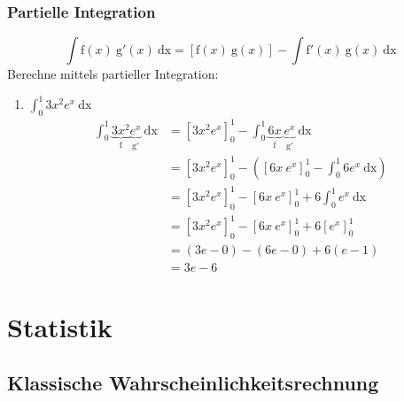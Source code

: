 \documentclass[11pt, a4paper]{article}
\newcommand{\dx}{\ \mathrm{dx}}
\begin{document}
\subsubsection{Partielle Integration}
\[ \int \mathrm{f}(x) \ \mathrm{g}'(x) \dx = \left[ \mathrm{f}(x) \ \mathrm{g}(x) \right] - \int \mathrm{f}'(x) \ \mathrm{g}(x) \dx \]
Berechne mittels partieller Integration:
\begin{enumerate}
	\item $\int_0^1 3x^2 e^x \dx$
		\begin{align*}
			\int_0^1 \underbrace{3x^2}_\mathrm{f} \underbrace{e^x}_\mathrm{g'} \dx &= \left[ 3x^2 e^x \right]_0^1 - \int_0^1 \underbrace{6x}_\mathrm{f} \ \underbrace{e^x}_\mathrm{g'} \dx \\
			&= \left[ 3x^2 e^x \right]_0^1 - \left( \left[ 6x \ e^x \right]_0^1 - \int_0^1 6 e^x \dx \right) \\
			&= \left[ 3x^2 e^x \right]_0^1 - \left[ 6x \ e^x \right]_0^1 + 6 \int_0^1 e^x \dx \\
			&= \left[ 3x^2 e^x \right]_0^1 - \left[ 6x \ e^x \right]_0^1 + 6 \left[ e^x \right]_0^1 \\
			&= \left( 3 e - 0 \right) - \left( 6 e - 0 \right) + 6 \left( e - 1 \right) \\
			&= 3e - 6
		\end{align*}
\end{enumerate}

\newpage
\section{Statistik}
\subsection{Klassische Wahrscheinlichkeitsrechnung}
\end{document}
